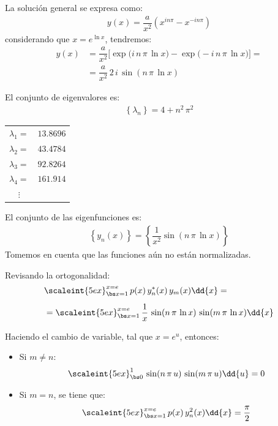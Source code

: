 \begin{ejemplo}
La solución general se expresa como:
\begin{align*}
y (x) = \dfrac{a}{x^{2}} \left( x^{i n \pi} - x^{-i n \pi} \right)
\end{align*}
considerando que $x = e^{\ln x}$, tendremos:
\begin{align*}
y (x) &= \dfrac{a}{x^{2}} \bigg[ \exp \big( i \, n \, \pi \, \ln x \big) -  \exp \big( - i \, n \, \pi \, \ln x \big) \bigg] = \\[0.5em] 
&= \dfrac{a}{x^{2}} \, 2 \, i \, \sin (n \, \pi \, \ln x)
\end{align*}

El conjunto de eigenvalores es:
\begin{align*}
\left\{ \lambda_{n} \right\} = 4 + n^{2} \, \pi^{2}
\end{align*}
{
\def\arraystretch{1}
\begin{tabular}{c c}
$\lambda_{1} =$ & $13.8696$ \\
$\lambda_{2} =$ & $43.4784$ \\
$\lambda_{3} =$ & $92.8264$ \\
$\lambda_{4} =$ & $161.914$ \\
$\vdots$
\end{tabular}}

El conjunto de las eigenfunciones es:
\begin{align*}
\left\{ y_{n} (x) \right\} = \left\{ \dfrac{1}{x^{2}} \sin (n \, \pi \, \ln x) \right\}
\end{align*}
Tomemos en cuenta que las funciones aún no están normalizadas.
\par
Revisando la ortogonalidad:
\begin{align*}
&\scaleint{5ex}_{\bs x=1}^{x=e} \, p (x) \, y_{n}^{*} (x) \, y_{m}(x) \dd{x} = \\[0.5em] 
&= \scaleint{5ex}_{\bs x=1}^{x=e} \, \dfrac{1}{x} \, \sin (n \, \pi  \, \ln x) \, \sin (m \, \pi  \, \ln x) \dd{x}
\end{align*}

Haciendo el cambio de variable, tal que $x = e^{u}$, entonces:
\begin{itemize}
\item  Si $m \neq n$:
\begin{align*}
\scaleint{5ex}_{\bs 0}^{1} \, \sin (n \, \pi  \, u) \, \sin (m \, \pi  \, u) \dd{u} = 0
\end{align*}
\item Si $m = n$, se tiene que:
\begin{align*}
\scaleint{5ex}_{\bs x=1}^{x=e} \, p(x) \, y_{n}^{2} (x) \dd{x} = \dfrac{\pi}{2}
\end{align*}
\end{itemize}


\end{ejemplo}

